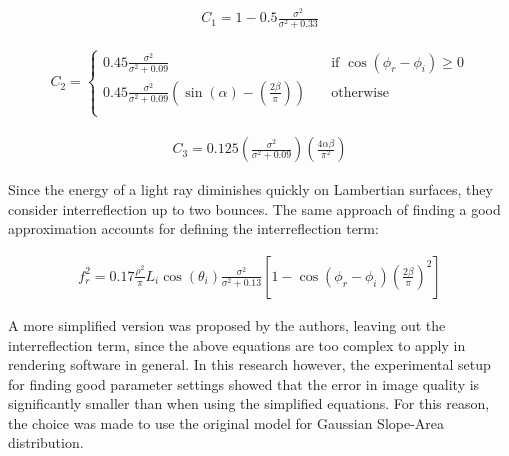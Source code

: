 	\begin{eqnarray*}
		C_1 = 1 - 0.5\frac{\sigma^2}{\sigma^2+0.33}
	\end{eqnarray*}

	\begin{eqnarray*}
		C_2 =
			\begin{cases}
				0.45\frac{\sigma^2}{\sigma^2+0.09} 		& \quad \text{if $\cos(\phi_r - \phi_i) \geq 0$}\\
				0.45\frac{\sigma^2}{\sigma^2+0.09} \left( \sin(\alpha) - \left( \frac{2\beta}{\pi}\right)\right) 	& \quad \text{otherwise}\\
			\end{cases}
	\end{eqnarray*}

	\begin{eqnarray*}
		C_3 = 0.125 \left( \frac{\sigma^2}{\sigma^2+0.09} \right)\left( \frac{4\alpha\beta}{\pi^2} \right)
	\end{eqnarray*}

\noindent Since the energy of a light ray diminishes quickly on Lambertian surfaces, they consider interreflection up to two bounces. The same approach of finding a good approximation accounts for defining the interreflection term:

	\begin{eqnarray*}
		f_r^2 = 0.17\frac{\rho^2}{\pi}L_i\cos(\theta_i)\frac{\sigma^2}{\sigma^2+0.13}\left[1-\cos(\phi_r-\phi_i)\left( \frac{2\beta}{\pi} \right)^2 \right]
	\end{eqnarray*}

\noindent A more simplified version was proposed by the authors, leaving out the interreflection term, since the above equations are too complex to apply in rendering software in general. In this research however, the experimental setup for finding good parameter settings showed that the error in image quality is significantly smaller than when using the simplified equations. For this reason, the choice was made to use the original model for Gaussian Slope-Area distribution.




